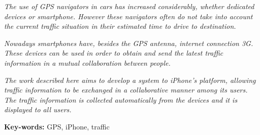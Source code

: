 \emph{The use of GPS navigators in cars has increased considerably, whether dedicated devices or smartphone. However these navigators often do not take into account the current traffic situation in their estimated time to drive to destination.}

\emph{Nowadays smartphones have, besides the GPS antenna, internet connection 3G. These devices can be used in order to obtain and send the latest traffic information in a mutual collaboration between people.}

\emph{The work described here aims to develop a system to iPhone's platform, allowing traffic information to be exchanged in a collaborative manner among its users. The traffic information is collected automatically from the devices and it is displayed to all users.}

  
\textbf{Key-words:} GPS, iPhone, traffic